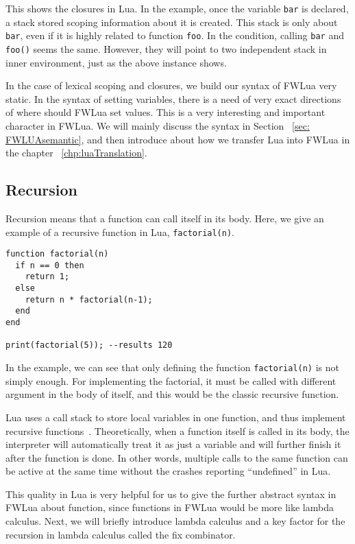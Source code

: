 This shows the closures in Lua.
In the example, once the variable {\tt bar} is declared, a stack stored scoping information about it is created.
This stack is only about {\tt bar}, even if it is highly related to function {\tt foo}.
In the condition, calling {\tt bar} and {\tt foo()} seems the same. However, they will point to two independent stack in inner environment, just as the above instance shows.

In the case of lexical scoping and closures, we build our syntax of FWLua very static. In the syntax of setting variables, there is a need of very exact directions of where should FWLua set values. This is a very interesting and important character in FWLua. We will mainly discuss the syntax in Section ~\ref{sec: FWLUAsemantic}, and then introduce about how we transfer Lua into FWLua in the chapter ~\ref{chp:luaTranslation}.

\subsection{Recursion}\label{sec:recursions}

Recursion means that a function can call itself in its body.
Here, we give an example of a recursive function in Lua, {\tt factorial(n)}.

\begin{verbatim}
function factorial(n)
  if n == 0 then
    return 1;
  else
    return n * factorial(n-1);
  end
end

print(factorial(5)); --results 120
\end{verbatim}

In the example, we can see that only defining the function {\tt factorial(n)} is not simply enough. For implementing the factorial, it must be called with different argument in the body of itself, and this would be the classic recursive function.

Lua uses a call stack to store local variables in one function, and thus implement recursive functions~\cite{begLua}. Theoretically, when a function itself is called in its body, the interpreter will automatically treat it as just a variable and will further finish it after the function is done. In other words, multiple calls to the same function can be active at the same time without the crashes reporting ``undefined'' in Lua.

This quality in Lua is very helpful for us to give the further abstract syntax in FWLua about function, since functions in FWLua would be more like lambda calculus. Next, we will briefly introduce lambda calculus and a key factor for the recursion in lambda calculus called the fix combinator.

